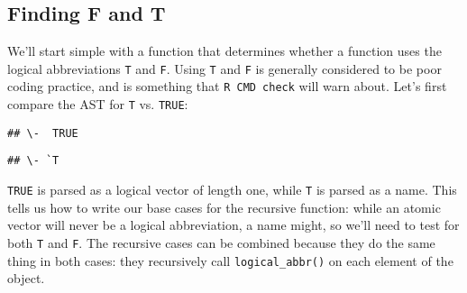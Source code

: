 \hypertarget{finding-f-and-t}{%
\subsection{Finding F and T}\label{finding-f-and-t}}

We'll start simple with a function that determines whether a function
uses the logical abbreviations \texttt{T} and \texttt{F}. Using
\texttt{T} and \texttt{F} is generally considered to be poor coding
practice, and is something that \texttt{R\ CMD\ check} will warn about.
Let's first compare the AST for \texttt{T} vs. \texttt{TRUE}:

\begin{Shaded}
\begin{Highlighting}[]
\NormalTok{(}\NormalTok{)}
\end{Highlighting}
\end{Shaded}

\begin{verbatim}
## \-  TRUE
\end{verbatim}

\begin{Shaded}
\begin{Highlighting}[]
\end{Highlighting}
\end{Shaded}

\begin{verbatim}
## \- `T
\end{verbatim}

\texttt{TRUE} is parsed as a logical vector of length one, while
\texttt{T} is parsed as a name. This tells us how to write our base
cases for the recursive function: while an atomic vector will never be a
logical abbreviation, a name might, so we'll need to test for both
\texttt{T} and \texttt{F}. The recursive cases can be combined because
they do the same thing in both cases: they recursively call
\texttt{logical\_abbr()} on each element of the object.

